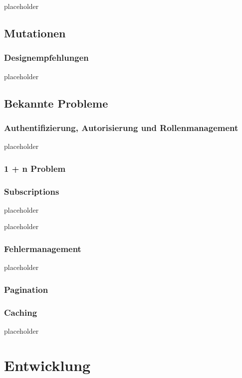 \documentclass[bachelor, german ]{hgbthesis}
\begin{document}
placeholder
\pagebreak

\section{Mutationen}

\subsection{Designempfehlungen}

placeholder
\pagebreak

\section{Bekannte Probleme}

\subsection{Authentifizierung, Autorisierung und Rollenmanagement}

placeholder
\pagebreak

\subsection{1 + n Problem}

\subsection{Subscriptions}

placeholder
\pagebreak

placeholder
\pagebreak

\subsection{Fehlermanagement}

placeholder
\pagebreak

\subsection{Pagination}

\subsection{Caching}

placeholder
\pagebreak

\chapter{Entwicklung}
\end{document}
